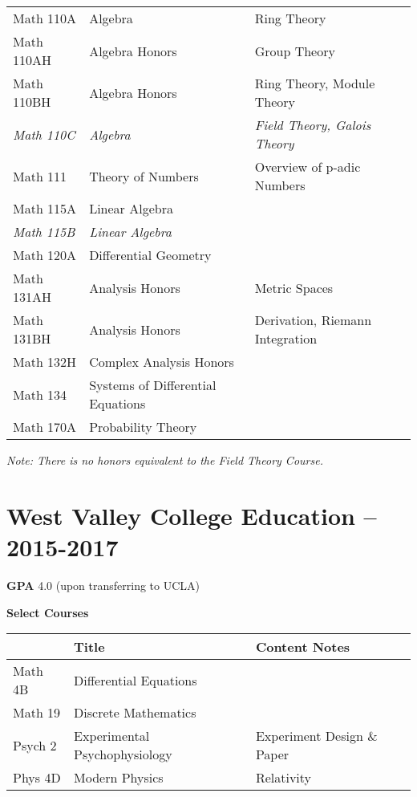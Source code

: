 \documentclass[11pt]{article}
\begin{document}
\begin{tabular}{l l l}
Math 110A & Algebra & Ring Theory \\
Math 110AH & Algebra Honors & Group Theory \\
Math 110BH & Algebra Honors & Ring Theory, Module Theory \\
\textit{Math 110C} & \textit{Algebra} & \textit{Field Theory, Galois Theory} \\
Math 111 & Theory of Numbers & Overview of p-adic Numbers \\
Math 115A & Linear Algebra & \\
\textit{Math 115B} & \textit{Linear Algebra} & \\
Math 120A & Differential Geometry & \\
Math 131AH & Analysis Honors & Metric Spaces \\
Math 131BH & Analysis Honors & Derivation, Riemann Integration \\
Math 132H & Complex Analysis Honors & \\
Math 134 & Systems of Differential Equations & \\
Math 170A & Probability Theory & \\
\hline
\end{tabular}

\textit{Note: There is no honors equivalent to the Field Theory Course.}

\section{West Valley College Education -- 2015-2017}

\textbf{GPA} 4.0 (upon transferring to UCLA)

\textbf{Select Courses}

\begin{tabular}{l l l}
\hline
 & Title & Content Notes \\
\hline
Math 4B & Differential Equations & \\
Math 19 & Discrete Mathematics & \\
Psych 2 & Experimental Psychophysiology & Experiment Design \& Paper \\
Phys 4D & Modern Physics & Relativity \\
\hline
\end{tabular}
\end{document}
